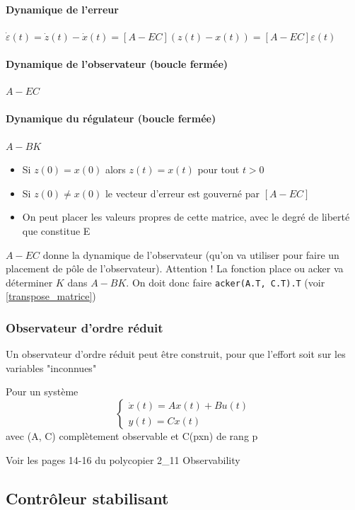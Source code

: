 \documentclass[resume]{subfiles}
\begin{document}
\paragraph{Dynamique de l'erreur} $\dot{\varepsilon}(t) = \dot{z}(t) - \dot{x}(t) = [A - EC] (z(t) - x(t)) = [A - EC] \varepsilon(t)$ 
\paragraph{Dynamique de l'observateur (boucle fermée)} $A-EC$
\paragraph{Dynamique du régulateur (boucle fermée)} $A-BK$



\begin{itemize}
\item Si $z(0)=x(0)$ alors $z(t)=x(t)$ pour tout $t>0$ 
\item Si $z(0)\neq x(0)$ le vecteur d'erreur est gouverné par $[A-EC]$ 
\item On peut placer les valeurs propres de cette matrice, avec le degré de liberté que constitue E  
\end{itemize}
$A-EC$ donne la dynamique de l'observateur (qu'on va utiliser pour faire un placement de pôle de l'observateur). Attention ! La fonction place ou acker va déterminer $K$ dans $A-BK$. On doit donc faire
\verb!acker(A.T, C.T).T! (voir \ref{transpose_matrice})
\subsubsection{Observateur d'ordre réduit}

Un observateur d’ordre réduit peut être construit, pour que l'effort soit sur les variables "inconnues"

  Pour un système \begin{equation}\begin{cases}\dot{x}(t)=Ax(t)+Bu(t)\\y(t)=Cx(t)\end{cases}\end{equation} avec (A, C) complètement observable et C(pxn) de rang p

Voir les pages 14-16 du polycopier 2\_11 Observability 

\subsection{Contrôleur stabilisant}
\end{document}
